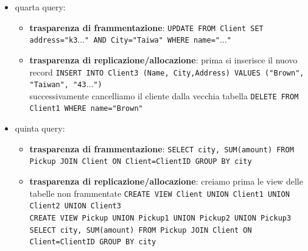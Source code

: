 \begin{esempio} 
\begin{itemize}
\begin{itemize}
                        \item \textbf{trasparenza di replicazione/allocazione}:  \texttt{SELECT machine FROM Produciton2 as P JOIN Pickup2 as PU ON P.SN = PU.SN JOIN Client2 ON Client.id=client WHERE S.Name = "Brown" AND parttype="Keyboard"}
                        \item \textbf{trasparenza di linguaggio}:  \texttt{SELECT machine FROM Produciton2@company.com as P JOIN Pickup2@company.com as PU ON P.SN = PU.SN JOIN Client2@company.com ON Client.id=client WHERE S.Name = "Brown" AND parttype="Keyboard"}
                  \end{itemize}
            \item quarta query:
                  \begin{itemize}
                        \item \textbf{trasparenza di frammentazione}:  \texttt{UPDATE FROM Client SET address="k3$\dots$" AND City="Taiwa" WHERE name="$\dots$"}
                        \item \textbf{trasparenza di replicazione/allocazione}:  prima si inserisce il nuovo record
                              \texttt{INSERT INTO Client3 (Name, City,Address) VALUES ("Brown", "Taiwan", "43$\dots$")}\\ successivamente cancelliamo il cliente dalla vecchia tabella
                              \texttt{DELETE FROM Client1 WHERE name="Brown"}
                  \end{itemize}
            \item quinta query:
                  \begin{itemize}
                        \item \textbf{trasparenza di frammentazione}:  \texttt{SELECT city, SUM(amount) FROM Pickup JOIN Client ON Client=ClientID GROUP BY city}
                        \item \textbf{trasparenza di replicazione/allocazione}: creiamo prima
                              le view delle tabelle non frammentate
                              \texttt{CREATE VIEW Client UNION Client1 UNION Client2 UNION Client3} \\
                              \texttt{CREATE VIEW Pickup UNION Pickup1 UNION Pickup2 UNION Pickup3} \\
                              \texttt{SELECT city, SUM(amount) FROM Pickup JOIN Client ON Client=ClientID GROUP BY city}
                  \end{itemize}
      \end{itemize}
\end{esempio}
